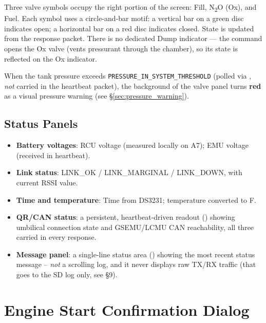 ﻿\documentclass[11pt,letterpaper]{article}
\begin{document}
Three valve symbols occupy the right portion of the screen:
Fill, N\textsubscript{2}O (Ox), and Fuel.
Each symbol uses a circle-and-bar motif: a vertical bar on a green disc
indicates open; a horizontal bar on a red disc indicates closed.
State is updated from the  response packet.  There is no
dedicated Dump indicator --- the  command opens the Ox valve
(vents pressurant through the chamber), so its state is reflected on the
Ox indicator.

\begin{sloppypar}
When the tank pressure exceeds \texttt{PRESSURE\_IN\_SYSTEM\_THRESHOLD}
(polled via , \emph{not} carried in the heartbeat
packet), the background of the valve panel turns \textbf{red} as a visual
pressure warning (see §\ref{sec:pressure_warning}).
\end{sloppypar}

\subsection{Status Panels}

\begin{itemize}[nosep]
  \item \textbf{Battery voltages}: RCU voltage (measured locally on A7);
        EMU voltage (received in heartbeat).
  \item \textbf{Link status}: LINK\_OK / LINK\_MARGINAL / LINK\_DOWN, with
        current RSSI value.
  \item \textbf{Time and temperature}: Time from DS3231; temperature
        converted to \textdegree F.
  \item \textbf{QR/CAN status}: a persistent, heartbeat-driven readout
        () showing umbilical connection
        state and GSEMU/LCMU CAN reachability, all three carried in every
         response.
  \item \textbf{Message panel}: a single-line status area
        () showing the most recent status message --
        \emph{not} a scrolling log, and it never displays raw TX/RX
        traffic (that goes to the SD log only, see §9).
\end{itemize}

\section{Engine Start Confirmation Dialog}
\label{sec:confirm_dialog}
\end{document}

